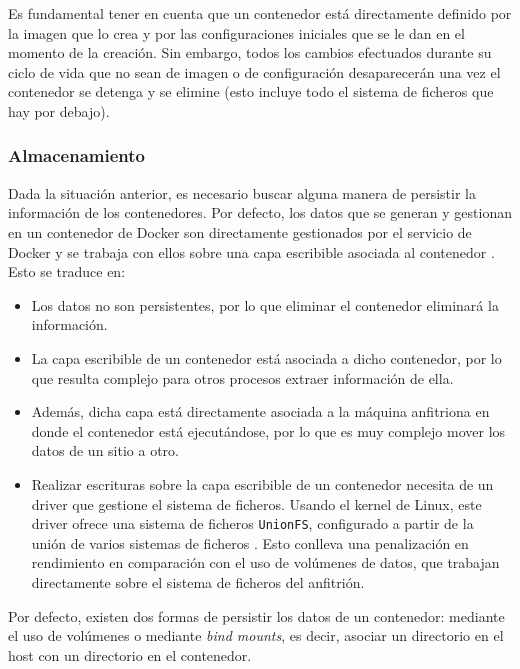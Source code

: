 Es fundamental tener en cuenta que un contenedor está directamente definido por la
imagen que lo crea y por las configuraciones iniciales que se le dan en el momento
de la creación. Sin embargo, todos los cambios efectuados durante su ciclo de vida
que no sean de imagen o de configuración desaparecerán una vez el contenedor se
detenga y se elimine (esto incluye todo el sistema de ficheros que hay por
debajo).

\subsubsection*{Almacenamiento}
Dada la situación anterior, es necesario buscar alguna manera de persistir la
información de los contenedores. Por defecto, los datos que se generan y gestionan
en un contenedor de Docker son directamente gestionados por el servicio de Docker
y se trabaja con ellos sobre una capa escribible asociada al contenedor \cite{ManageDataDocker2021}.
Esto se traduce en:

\begin{itemize}
    \item Los datos no son persistentes, por lo que eliminar el contenedor eliminará
          la información.
    \item La capa escribible de un contenedor está asociada a dicho contenedor, por
          lo que resulta complejo para otros procesos extraer información de ella.
    \item Además, dicha capa está directamente asociada a la máquina anfitriona en
          donde el contenedor está ejecutándose, por lo que es muy complejo mover
          los datos de un sitio a otro.
    \item Realizar escrituras sobre la capa escribible de un contenedor necesita de
          un driver que gestione el sistema de ficheros. Usando el kernel de Linux,
          este driver ofrece una sistema de ficheros \texttt{UnionFS}, configurado
          a partir de la unión de varios sistemas de ficheros \cite{UnionFS2020}. Esto
          conlleva una penalización en rendimiento en comparación con el uso de volúmenes
          de datos, que trabajan directamente sobre el sistema de ficheros del anfitrión.
\end{itemize}

Por defecto, existen dos formas de persistir los datos de un contenedor: mediante el
uso de volúmenes o mediante \textit{bind mounts}, es decir, asociar un directorio
en el host con un directorio en el contenedor.

